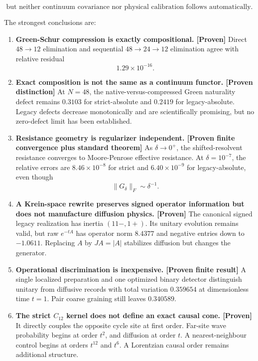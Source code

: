 \documentclass[11pt,a4paper,openany]{report}
\newcommand{\statusProven}{\textcolor{fingreen}{[Proven]}}
\begin{document}
\[
\boxed{
\text{but neither continuum covariance nor physical calibration follows automatically.}
}
\]

The strongest conclusions are:

\begin{enumerate}
\item 
\textbf{Green-Schur compression is exactly compositional. \statusProven{}} Direct \(48\to12\) elimination and sequential \(48\to24\to12\) elimination agree with relative residual \[
   1.29\times10^{-16}.
   \]

\item 
\textbf{Exact composition is not the same as a continuum functor. [Proven distinction]} At \(N=48\), the native-versus-compressed Green naturality defect remains \(0.3103\) for strict-absolute and \(0.2419\) for legacy-absolute. Legacy defects decrease monotonically and are scientifically promising, but no zero-defect limit has been established.

\item 
\textbf{Resistance geometry is regularizer independent. [Proven finite convergence plus standard theorem]} As \(\delta\to0^+\), the shifted-resolvent resistance converges to Moore-Penrose effective resistance. At \(\delta=10^{-7}\), the relative errors are \(8.46\times10^{-8}\) for strict and \(6.40\times10^{-9}\) for legacy-absolute, even though \[
   \|G_\delta\|_F\sim\delta^{-1}.
   \]

\item 
\textbf{A Krein-space rewrite preserves signed operator information but does not manufacture diffusion physics. \statusProven{}} The canonical signed legacy realization has inertia \((11-,1+)\). Its unitary evolution remains valid, but raw \(e^{-tA}\) has operator norm \(8.4377\) and negative entries down to \(-1.0611\). Replacing \(A\) by \(JA=|A|\) stabilizes diffusion but changes the generator.

\item 
\textbf{Operational discrimination is inexpensive. [Proven finite result]} A single localized preparation and one optimized binary detector distinguish unitary from diffusive records with total variation \(0.359654\) at dimensionless time \(t=1\). Pair coarse graining still leaves \(0.340589\).

\item 
\textbf{The strict \(C_{12}\) kernel does not define an exact causal cone. \statusProven{}} It directly couples the opposite cycle site at first order. Far-site wave probability begins at order \(t^2\), and diffusion at order \(t\). A nearest-neighbour control begins at orders \(t^{12}\) and \(t^6\). A Lorentzian causal order remains additional structure.


\end{enumerate}
\end{document}
